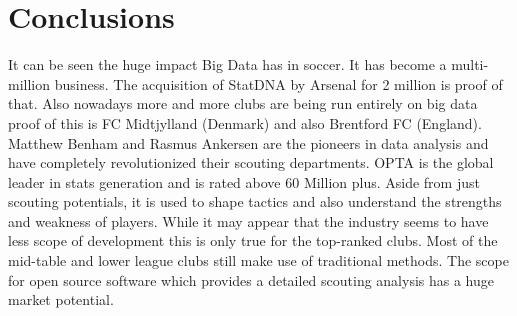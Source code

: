 \documentclass[sigconf]{acmart}
\begin{document}
\section{Conclusions}

It can be seen the huge impact Big Data has in soccer. It has become a multi-million business. The acquisition of StatDNA by Arsenal for 2 million is proof of that. Also nowadays more and more clubs are being run entirely on big data proof of this is FC Midtjylland (Denmark) and also Brentford FC (England). Matthew Benham and Rasmus Ankersen are the pioneers in data analysis and have completely revolutionized their scouting departments. OPTA is the global leader in stats generation and is rated above 60 Million plus. Aside from just scouting potentials, it is used to shape tactics and also understand the strengths and weakness of players. While it may appear that the industry seems to have less scope of development this is only true for the top-ranked clubs. Most of the mid-table and lower league clubs still make use of traditional methods. The scope for open source software which provides a detailed scouting analysis has a huge market potential.


 
\end{document}
